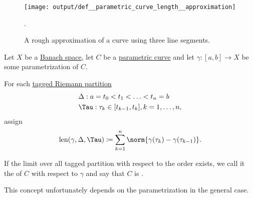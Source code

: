 \begin{definition}\label{def:arc_length}
  \begin{figure}[!ht]
    \centering
    \texttt{[image: output/def\_\_parametric\_curve\_length\_\_approximation]}
    \caption{A rough approximation of a curve using three line segments.}\label{def:arc_length/approximation}.
  \end{figure}

  Let \( X \) be a \hyperref[def:banach_space]{Banach space}, let \( C \) be a \hyperref[def:parametric_curve]{parametric curve} and let \( \gamma: [a, b] \to X \) be some parametrization of \( C \).

  For each \hyperref[def:riemann_partition/tagged]{tagged Riemann partition}
  \begin{equation*}
    \begin{aligned}
      &\Delta: a = t_0 < t_1 < \ldots < t_n = b \\
      &\Tau: \tau_k \in [t_{k-1}, t_k], k = 1, \ldots, n,
    \end{aligned}
  \end{equation*}
  assign
  \begin{equation*}
    \len(\gamma, \Delta, \Tau) \coloneqq \sum_{k=1}^n \norm{\gamma(\tau_k) - \gamma(\tau_{k-1})}.
  \end{equation*}

  If the limit over all tagged partition with respect to the order  exists, we call it the  of \( C \) with respect to \( \gamma \) and say that \( C \) is .

  This concept unfortunately depends on the parametrization in the general case.
\end{definition}


